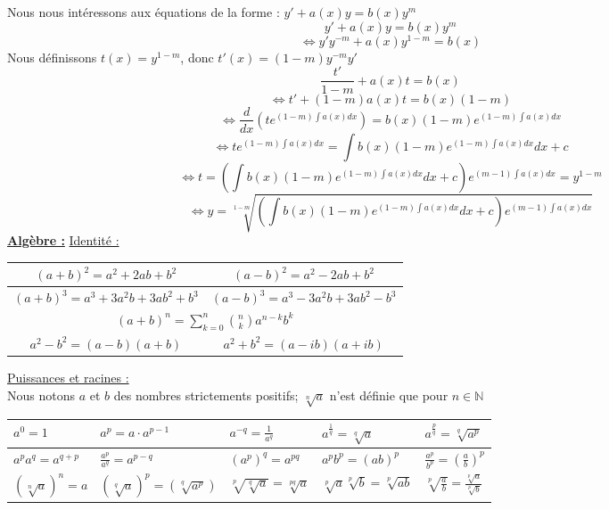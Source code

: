 \documentclass[12pt, letterpaper]{article}
\begin{document}
\\
\\
Nous nous intéressons aux équations de la forme : $y' + a(x)y = b(x)y^m$
\[
y' + a(x)y = b(x)y^m
\]
\[
\Leftrightarrow y'y^{-m} + a(x)y^{1-m} = b(x)
\]
Nous définissons $t(x) = y^{1-m}$, donc $t'(x) = (1-m)y^{-m}y'$
\[
\frac{t'}{1-m} + a(x)t = b(x)
\]
\[
\Leftrightarrow t' + (1-m)a(x)t = b(x)(1-m)
\]
\[
\Leftrightarrow \frac{d}{dx}\left(te^{(1-m) \int a(x) dx}\right)= b(x)(1-m)e^{(1-m) \int a(x) dx}
\]
\[
\Leftrightarrow te^{(1-m) \int a(x) dx}= \int b(x)(1-m)e^{(1-m) \int a(x) dx} dx + c
\]
\[
\Leftrightarrow t= \left(\int b(x)(1-m)e^{(1-m) \int a(x) dx} dx + c\right) e^{(m-1) \int a(x) dx}= y^{1-m}
\]
\[
\Leftrightarrow y= \sqrt[1-m]{\left(\int b(x)(1-m)e^{(1-m) \int a(x) dx} dx + c\right) e^{(m-1) \int a(x) dx}}
\]
\newpage
\noindent \textbf{\underline{Algèbre :}}
\newline
\newline
\underline{Identité :}
    \begin{center}
        \begin{tabular}{|c|c|}
        \hline
        \rule{0pt}{1.2em}
        $(a+b)^2 = a^2+2ab+b^2$ & $(a-b)^2 = a^2-2ab+b^2$ \\[2pt]
        \hline
        \rule{0pt}{1.2em}
        $(a+b)^3 = a^3+3a^2b+ 3ab^2+b^3$ & $(a-b)^3 = a^3-3a^2b+ 3ab^2-b^3$ \\[2pt]
        \hline
        \multicolumn{2}{|c|}{\rule{0pt}{1.2em}$(a+b)^n = \sum_{k=0}^{n}\binom{n}{k}a^{n-k} b^k$} \\[2pt]  %
        \hline
        \rule{0pt}{1.2em}
        $a^2-b^2 = (a-b)(a+b)$ & $a^2+b^2 = (a-ib)(a+ib)$\\[2pt]
        \hline
        \end{tabular}
    \end{center}
\underline{Puissances et racines :}
\\
Nous notons $a$ et $b$ des nombres strictements positifs; $\sqrt[n]{a}$ n'est définie que pour $n \in \mathbb{N}$
    \begin{center}
        \begin{tabular}{|l|l|l|l|l|}
        \hline
        \rule{0pt}{1.8em}
        $a^0 = 1$ & $a^p = a\cdot a^{p-1}$ & $a^{-q} = \frac{1}{a^q}$ & $a^{\frac{1}{q}} = \sqrt[q]{a}$ & $a^{\frac{p}{q}} = \sqrt[q]{a^p}$\\[8pt]
        \hline
        \rule{0pt}{1.4em}
        $a^pa^q = a^{q+p}$ & $\frac{a^p}{a^q} = a^{p-q}$ & $\left(a^p\right)^q = a^{pq}$ & $a^pb^p = (ab)^p$ & $\frac{a^p}{b^p} = \left(\frac{a}{b}\right)^p$\\[4pt]
        \hline
        \rule{0pt}{1.4em}
        $\left(\sqrt[n]{a}\right)^n = a$ & $\left(\sqrt[q]{a}\right)^p = \left(\sqrt[q]{a^p}\right)$ & $\sqrt[p]{\sqrt[q]{a}} = \sqrt[pq]{a}$ & $\sqrt[p]{a}\sqrt[p]{b} = \sqrt[p]{ab}$ & $\sqrt[p]{\frac{a}{b}} = \frac{\sqrt[p]{a}}{\sqrt[p]{b}}$\\[4pt]
        \hline
        \end{tabular}
    \end{center}
\end{document}

